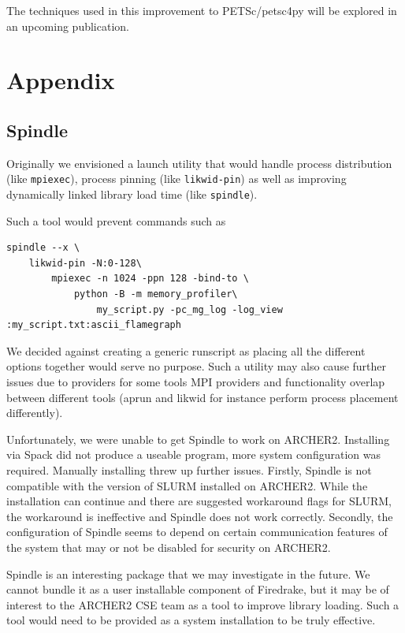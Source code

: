 \documentclass[a4paper,11pt]{article}
\begin{document}
The techniques used in this improvement to PETSc/petsc4py will be explored in an upcoming publication.


\appendix
\section{Appendix}
\label{sec:app}
\subsection{Spindle}
\label{ssec:spindle}
Originally we envisioned a launch utility that would handle process distribution (like \verb`mpiexec`), process pinning (like \verb`likwid-pin`) as well as improving dynamically linked library load time (like \verb`spindle`).

Such a tool would prevent commands such as
\begin{lstlisting}
spindle --x \
    likwid-pin -N:0-128\
        mpiexec -n 1024 -ppn 128 -bind-to \
            python -B -m memory_profiler\
                my_script.py -pc_mg_log -log_view :my_script.txt:ascii_flamegraph
\end{lstlisting}

We decided against creating a generic runscript as placing all the different options together would serve no purpose.
Such a utility may also cause further issues due to providers for some tools MPI providers and functionality overlap between different tools (aprun and likwid for instance perform process placement differently).

Unfortunately, we were unable to get Spindle\cite{spindlepaper,spindleweb} to work on ARCHER2.
Installing via Spack did not produce a useable program, more system configuration was required.
Manually installing threw up further issues.
Firstly, Spindle is not compatible with the version of SLURM installed on ARCHER2.
While the installation can continue and there are suggested workaround flags for SLURM, the workaround is ineffective and Spindle does not work correctly.
Secondly, the configuration of Spindle seems to depend on certain communication features of the system that may or not be disabled for security on ARCHER2.

Spindle is an interesting package that we may investigate in the future.
We cannot bundle it as a user installable component of Firedrake, but it may be of interest to the ARCHER2 CSE team as a tool to improve library loading.
Such a tool would need to be provided as a system installation to be truly effective.
\end{document}
